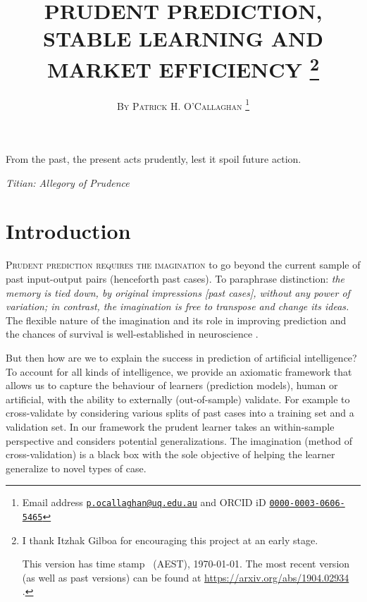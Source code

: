 \documentclass[12pt,a4paper,twoside]{article}
\title{\MakeUppercase{Prudent prediction, stable learning and market efficiency}
\footnote{I thank Itzhak Gilboa for encouraging this project at an early stage.

    This version has time stamp \currenttime~(AEST), \today. The most recent
    version (as well as past versions) can be found at
    \url{https://arxiv.org/abs/1904.02934} .}}
\author{\large\textsc{By Patrick H. O'Callaghan} \footnote{Email address
    \href{mailto:p.ocallaghan@uq.edu.au}{\texttt{p.ocallaghan@uq.edu.au}} and
    ORCID iD \href{http://orcid.org/0000-0003-0606-5465}{
      \texttt{0000-0003-0606-5465}}}}
\date{}
\begin{document}
  \maketitle

  \pagestyle{fancy}
\renewcommand{\abstractname}{\vspace{-\baselineskip}} \thispagestyle{plain}
%

\begin{abstract}%
   
\end{abstract}
\setlength{\epigraphwidth}{11.5cm}
\epigraph{From the past, the present acts prudently, lest it spoil future
  action.}{\emph{Titian:  Allegory of Prudence}
}
  \section{Introduction} \label{sec-introduction} 
\textsc{Prudent prediction requires the imagination} to go beyond the current
  sample of past input-output pairs (henceforth past cases). To paraphrase
  \citep[pages 9 and 10]{Hume-Human_nature} distinction: \emph{the memory is
  tied down, by original impressions \emph{[past cases]}, without any power of
  variation; in contrast, the imagination is free to transpose and change its
  ideas.} The flexible nature of the imagination and its role in improving
  prediction and the chances of survival is well-established in neuroscience
  \citep{Bartlett-remembering,Sudedendorf-Corballis-foresight,MM-memory-imagination-prediction}.
 

 But then how are we to explain the success in prediction of artificial
  intelligence?  To account for all kinds of intelligence, we provide an
  axiomatic framework that allows us to capture the behaviour of learners
  (prediction models), human or artificial, with the ability to externally
  (out-of-sample) validate.  For example to cross-validate by considering
  various splits of past cases into a training set and a validation set. In our
  framework the prudent learner takes an within-sample perspective \citep[page
  7, experiment 1]{Chervonenkis-Recollections} and considers potential
  generalizations.  The imagination (method of cross-validation) is a black box
  with the sole objective of helping the learner generalize to novel types of
  case. 
  
\end{document}
